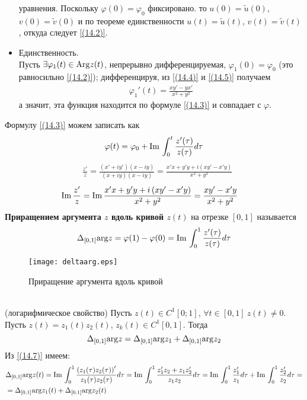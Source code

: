 \begin{itemize}
    уравнения. Поскольку $\varphi(0) = \varphi_0$ фиксировано. то $u(0) =
    \tilde{u}(0)$, $v(0) = \tilde{v}(0)$ и по теореме единственности $u(t) =
    \tilde{u}(t)$, $v(t) = \tilde{v}(t)$, откуда следует \eqref{(14.2)}.
    \item Единственность.
    \\
    Пусть $\exists \varphi_1(t) \in \mathrm{Arg} z(t)$, непрерывно дифференцируемая,
    $\varphi_1(0) = \varphi_0$ (это равносильно \eqref{(14.2)}); дифференцируя,
    из \eqref{(14.4)} и \eqref{(14.5)} получаем
    \begin{align*}
      \varphi_1'(t) = \frac{xy'-yx'}{x^2+y^2}
    \end{align*}
    а значит, эта функция находится по формуле \eqref{(14.3)} и совпадает с
    $\varphi$.
\end{itemize}
\note
Формулу \eqref{(14.3)} можем записать как
\begin{equation}\label{(14.6)}
    \varphi(t) = \varphi_0 + \mathrm{Im}\, \int_{0}^t \frac{z'(\tau)}{z(\tau)}d \tau
\end{equation}
\pr
\begin{align*}
  & \frac{z'}{z} = \frac{\left( x'+iy' \right)\left( x-iy \right)}{\left( x+iy \right)\left( x-iy \right)} = \frac{x'x+y'y+i\left( xy'-x'y \right)}{x^2+y^2}
\end{align*}
\begin{align*}
  & \mathrm{Im}\, \frac{z'}{z} = \mathrm{Im}\, \frac{x'x+y'y+i\left( xy'-x'y \right)}{x^2+y^2} = \frac{xy'-x'y}{x^2+y^2}
\end{align*}
\Def
\textbf{Приращением аргумента $z$ вдоль кривой $z(t)$} на отрезке $[0,1]$
называется
\begin{equation}\label{(14.7)}
    \Delta_{[0,1]}\mathrm{arg} z = \varphi(1) - \varphi(0) = \mathrm{Im}\, \int_{0}^1 \frac{z'(\tau)}{z(\tau)}d \tau
\end{equation}
\begin{figure}[h!]
		\centering
		\texttt{[image: deltaarg.eps]}
    \caption{Приращение аргумента вдоль кривой}
		\label{fig:14.1}
\end{figure}\\
\theorem (логарифмическое свойство)
Пусть $z(t) \in C^1[0;1]$, $\forall t \in [0,1] \ z(t) \neq 0$. Пусть $z(t) =
z_1(t)z_2(t)$, $z_k(t) \in C^1[0,1]$. Тогда
\begin{equation}\label{(14.8)}
    \Delta_{[0,1]}\mathrm{arg} z = \Delta_{[0,1]}\mathrm{arg} z_1 + \Delta_{[0,1]}\mathrm{arg} z_2
\end{equation}
\pr
Из \eqref{(14.7)} имеем:
\begin{align*}
  & \Delta_{[0,1]} \mathrm{arg} z(t) = \mathrm{Im}\, \int_{0}^{1}\frac{\left( z_1(\tau)z_2(\tau) \right)'}{z_1(\tau)z_2(\tau)}d \tau =\mathrm{Im}\, \int_{0}^{1}\frac{z_1'z_2+z_1z_2'}{z_1z_2}d \tau = \mathrm{Im}\, \int_{0}^{1}\frac{z_1'}{z_1}d \tau + \mathrm{Im}\, \int_{0}^{1}\frac{z_2'}{z_2}d \tau = \\
  & = \Delta_{[0,1]} \mathrm{arg} z_1(t) + \Delta_{[0,1]} \mathrm{arg} z_2(t) 
\end{align*}
